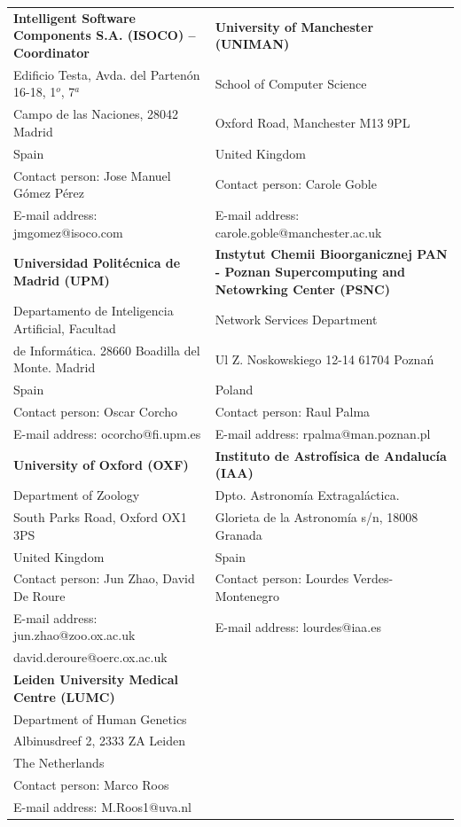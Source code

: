 \vspace{0.2cm}
\begin{centering}

\begin{tabular}{ | p{} | p{} |}
\hline
{\bf Intelligent Software Components S.A. (ISOCO) -- Coordinator} & {\bf University of Manchester (UNIMAN)}\\
Edificio Testa, Avda. del Parten\'on 16-18, 1$^{o}$, 7$^{a}$ & School of Computer Science\\
Campo de las Naciones, 28042 Madrid & Oxford Road, Manchester M13 9PL \\
Spain & United Kingdom\\
Contact person: Jose Manuel G\'omez P\'erez & Contact person: Carole Goble\\
E-mail address: jmgomez@isoco.com & E-mail address: carole.goble@manchester.ac.uk\\ \hline

{\bf Universidad Polit\'ecnica de Madrid (UPM)}&{\bf Instytut Chemii Bioorganicznej PAN - Poznan Supercomputing and Netowrking Center (PSNC)}\\
Departamento de Inteligencia Artificial, Facultad& Network Services Department\\
de Inform\'atica. 28660 Boadilla del Monte. Madrid & Ul Z. Noskowskiego 12-14 61704 Pozna\'n\\
Spain&Poland\\
Contact person: Oscar Corcho &Contact person: Raul Palma\\
E-mail address: ocorcho@fi.upm.es&E-mail address: rpalma@man.poznan.pl\\ \hline

{\bf University of Oxford (OXF)} &{\bf Instituto de Astrof\'isica de Andaluc\'ia (IAA)} \\
Department of Zoology &Dpto. Astronom\'ia Extragal\'actica.\\
South Parks Road, Oxford OX1 3PS &Glorieta de la Astronom\'ia s/n, 18008 Granada\\
United Kingdom&Spain\\
Contact person: Jun Zhao, David De Roure &Contact person: Lourdes Verdes-Montenegro\\
E-mail address: jun.zhao@zoo.ox.ac.uk &E-mail address: lourdes@iaa.es \\ 
david.deroure@oerc.ox.ac.uk & \\\hline

{\bf Leiden University Medical Centre (LUMC)} & \\
Department of Human Genetics & \\
Albinusdreef 2, 2333 ZA Leiden & \\
The Netherlands & \\
Contact person: Marco Roos & \\
E-mail address: M.Roos1@uva.nl& \\ \hline
\end{tabular}
\end{centering}
\newpage

